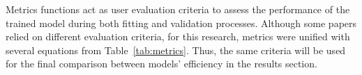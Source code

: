 %
%
Metrics functions act as user evaluation criteria to assess the performance of the trained model during both fitting and validation processes.
Although some papers relied on different evaluation criteria, for this research, metrics were unified with several equations from \mbox{Table~\ref{tab:metrics}}.
Thus, the same criteria will be used for the final comparison between models' efficiency in the results section.
\begin{table}[htbp]
    \renewcommand{\arraystretch}{1.3}
    \caption{Model's metrics functions}
    \centering
    \label{tab:metrics}
\end{table}

